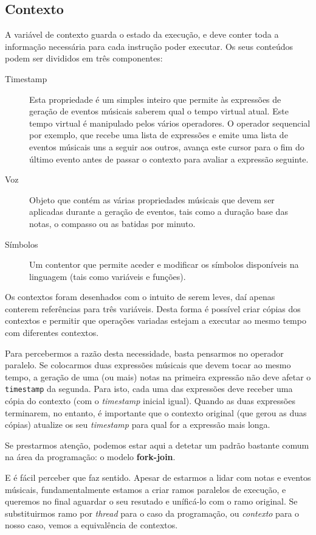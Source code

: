 \subsection{Contexto}
A variável de contexto guarda o estado da execução, e deve conter toda a informação necessária para cada instrução poder executar. Os seus conteúdos podem ser divididos em três componentes:
\begin{description}
 \item[Timestamp] Esta propriedade é um simples inteiro que permite às expressões de geração de eventos músicais saberem qual o tempo virtual atual. Este tempo virtual é manipulado pelos vários operadores. O operador sequencial por exemplo, que recebe uma lista de expressões e emite uma lista de eventos músicais uns a seguir aos outros, avança este cursor para o fim do último evento antes de passar o contexto para avaliar a expressão seguinte.
 \item[Voz] Objeto que contém as várias propriedades músicais que devem ser aplicadas durante a geração de eventos, tais como a duração base das notas, o compasso ou as batidas por minuto.
 \item[Símbolos] Um contentor que permite aceder e modificar os símbolos disponíveis na linguagem (tais como variáveis e funções).
 \end{description}
 
 Os contextos foram desenhados com o intuito de serem leves, daí apenas conterem  referências para três variáveis. Desta forma é possível criar cópias dos contextos e permitir que operações variadas estejam a executar ao mesmo tempo com diferentes contextos.
 
 Para percebermos a razão desta necessidade, basta pensarmos no operador paralelo. Se colocarmos duas expressões músicais que devem tocar ao mesmo tempo, a geração de uma (ou mais) notas na primeira expressão não deve afetar o \texttt{timestamp} da segunda. Para isto, cada uma das expressões deve receber uma cópia do contexto (com o \textit{timestamp} inicial igual). Quando as duas expressões terminarem, no entanto, é importante que o contexto original (que gerou as duas cópias) atualize os seu \textit{timestamp} para qual for a expressão mais longa.
 
 Se prestarmos atenção, podemos estar aqui a detetar um padrão bastante comum na área da programação: o modelo \textbf{fork-join}.
 
 E é fácil perceber que faz sentido. Apesar de estarmos a lidar com notas e eventos músicais, fundamentalmente estamos a criar ramos paralelos de execução, e queremos no final aguardar o seu resutado e uníficá-lo com o ramo original. Se substituirmos ramo por \textit{thread} para o caso da programação, ou \textit{contexto} para o nosso caso, vemos a equivalência de contextos.
 
